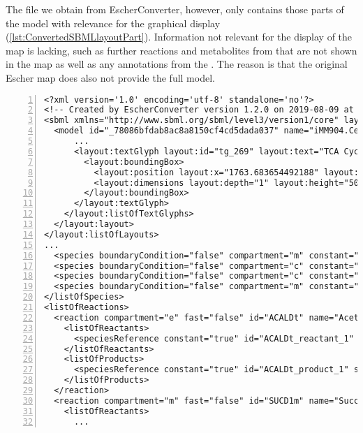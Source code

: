 The \SBML file we obtain from EscherConverter, however, only contains those parts of the model with relevance for the graphical display (\cref{lst:ConvertedSBMLlayoutPart}).
Information not relevant for the display of the map is lacking, such as further reactions and metabolites from \iMM that are not shown in the map as well as any \MIRIAM annotations \citep{Juty2012} from the \GEM.
The reason is that the original Escher map does also not provide the full model.
\begin{lstlisting}[language=SBML,numbers=left,captionpos=t,float=p,caption={Extract from the converted \SBML layout file for \iMM},label={lst:ConvertedSBMLlayoutPart}]
<?xml version='1.0' encoding='utf-8' standalone='no'?>
<!-- Created by EscherConverter version 1.2.0 on 2019-08-09 at 14:15:08 MESZ with JSBML version 1.4. -->
<sbml xmlns="http://www.sbml.org/sbml/level3/version1/core" layout:required="false" level="3" version="1" xmlns:layout="http://www.sbml.org/sbml/level3/version1/layout/version1">
  <model id="_78086bfdab8ac8a8150cf4cd5dada037" name="iMM904.Central carbon metabolism">
      ...
      <layout:textGlyph layout:id="tg_269" layout:text="TCA Cycle">
        <layout:boundingBox>
          <layout:position layout:x="1763.683654492188" layout:y="5946.125330570312" layout:z="0"/>
          <layout:dimensions layout:depth="1" layout:height="50" layout:width="160"/>
        </layout:boundingBox>
      </layout:textGlyph>
    </layout:listOfTextGlyphs>
  </layout:layout>
</layout:listOfLayouts>
...
  <species boundaryCondition="false" compartment="m" constant="false" hasOnlySubstanceUnits="true" id="ac_m" name="Acetate" sboTerm="SBO:0000247"/>
  <species boundaryCondition="false" compartment="c" constant="false" hasOnlySubstanceUnits="true" id="ac_c" name="Acetate" sboTerm="SBO:0000247"/>
  <species boundaryCondition="false" compartment="c" constant="false" hasOnlySubstanceUnits="true" id="g6p_c" name="D-Glucose 6-phosphate" sboTerm="SBO:0000247"/>
  <species boundaryCondition="false" compartment="m" constant="false" hasOnlySubstanceUnits="true" id="fadh2_m" name="Flavin adenine dinucleotide reduced" sboTerm="SBO:0000247"/>
</listOfSpecies>
<listOfReactions>
  <reaction compartment="e" fast="false" id="ACALDt" name="Acetaldehyde reversible transport" reversible="true" sboTerm="SBO:0000375">
    <listOfReactants>
      <speciesReference constant="true" id="ACALDt_reactant_1" sboTerm="SBO:0000010" species="acald_e" stoichiometry="1"/>
    </listOfReactants>
    <listOfProducts>
      <speciesReference constant="true" id="ACALDt_product_1" species="acald_c" stoichiometry="1"/>
    </listOfProducts>
  </reaction>
  <reaction compartment="m" fast="false" id="SUCD1m" name="Succinate dehydrogenase" reversible="true" sboTerm="SBO:0000375">
    <listOfReactants>
      ...
\end{lstlisting}

